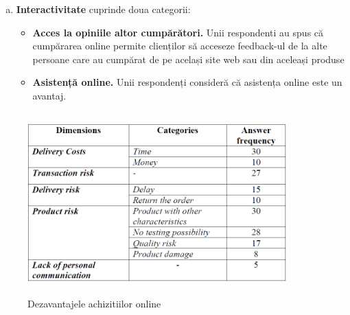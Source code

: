 \documentclass[a4paper, 12pt]{article}
\begin{document}
\begin{enumerate}[a.]
\begin{itemize}
	\end{itemize}
	\item\textbf{Interactivitate} cuprinde doua categorii:
	\begin{itemize}
		\item\textbf {Acces la opiniile altor cumpărători.} Unii respondenti au spus că cumpărarea online permite clienților să acceseze feedback-ul de la alte persoane care au cumpărat de pe același site web sau din aceleași produse
		\item\textbf{Asistență online.} Unii respondenți consideră că asistența online este un avantaj.
	\end{itemize}
	\end{enumerate}
		\begin{figure}[!htb]
		\centering
		\includegraphics[width=10cm, height=7cm]{"figures/noua.png"}
		\caption{Dezavantajele achizitiilor online}\label{fig:zece}
	\end{figure}
\end{document}

